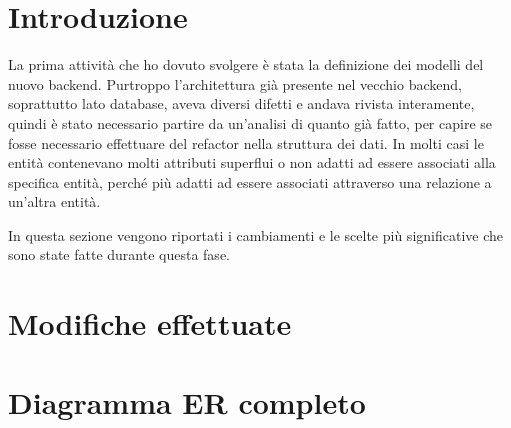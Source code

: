 \section{Introduzione}
La prima attività che ho dovuto svolgere è stata la definizione dei modelli del nuovo backend. Purtroppo l'architettura già presente nel vecchio backend, soprattutto lato database, aveva diversi difetti e andava rivista interamente, quindi è stato necessario partire da un'analisi di quanto già fatto, per capire se fosse necessario effettuare del refactor nella struttura dei dati. In molti casi le entità contenevano molti attributi superflui o non adatti ad essere associati alla specifica entità, perché più adatti ad essere associati attraverso una relazione a un'altra entità.

In questa sezione vengono riportati i cambiamenti e le scelte più significative che sono state fatte durante questa fase.

\section{Modifiche effettuate}

\section{Diagramma ER completo}
